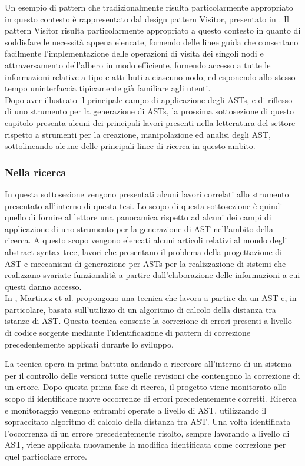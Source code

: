 Un esempio di pattern che tradizionalmente risulta particolarmente appropriato
in questo contesto è rappresentato dal design pattern Visitor, presentato in
\cite{gamma1995design}. Il pattern Visitor risulta particolarmente appropriato a
questo contesto in quanto di soddisfare le necessità appena elencate, fornendo
delle linee guida che consentano facilmente l’implementazione delle operazioni
di visita dei singoli nodi e attraversamento dell’albero in modo efficiente,
fornendo accesso a tutte le informazioni relative a tipo e attributi a ciascuno
nodo, ed esponendo allo stesso tempo uninterfaccia tipicamente già familiare
agli utenti.\\

Dopo aver illustrato il principale campo di applicazione degli ASTs, e di
riflesso di uno strumento per la generazione di ASTs, la prossima sottosezione
di questo capitolo presenta alcuni dei principali lavori presenti nella
letteratura del settore rispetto a strumenti per la creazione, manipolazione ed
analisi degli AST, sottolineando alcune delle principali linee di ricerca in
questo ambito.

\subsubsection{Nella ricerca}
\label{ast-research}

In questa sottosezione vengono presentati alcuni lavori correlati allo strumento
presentato all’interno di questa tesi. Lo scopo di questa sottosezione è quindi
quello di fornire al lettore una panoramica rispetto ad alcuni dei campi di
applicazione di uno strumento per la generazione di AST nell'ambito della
ricerca. A questo scopo vengono elencati alcuni articoli relativi al mondo degli
abstract syntax tree, lavori che presentano il problema della progettazione di
AST e meccanismi di generazione per ASTs per la realizzazione di sistemi che
realizzano svariate funzionalità a partire dall’elaborazione delle informazioni
a cui questi danno accesso.\\

In \cite{martinez2014accurate}, Martinez et al. propongono una tecnica che
lavora a partire da un AST e, in particolare, basata sull’utilizzo di un
algoritmo di calcolo della distanza tra istanze di AST. Questa tecnica consente
la correzione di errori presenti a livello di codice sorgente mediante
l’identificazione di pattern di correzione precedentemente applicati durante lo
sviluppo.

La tecnica opera in prima battuta andando a ricercare all’interno di un sistema
per il controllo delle versioni tutte quelle revisioni che contengono la
correzione di un errore. Dopo questa prima fase di ricerca, il progetto viene
monitorato allo scopo di identificare nuove occorrenze di errori precedentemente
corretti. Ricerca e monitoraggio vengono entrambi operate a livello di AST,
utilizzando il sopraccitato algoritmo di calcolo della distanza tra AST. Una
volta identificata l’occorrenza di un errore precedentemente risolto, sempre
lavorando a livello di AST, viene applicata nuovamente la modifica identificata
come correzione per quel particolare errore.\\

